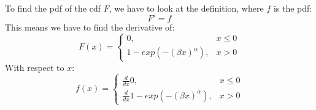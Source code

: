 To find the pdf of the cdf $F$, we have to look at the definition, where $f$ is the pdf:
$$
F' = f
$$
This means we have to find the derivative of:
$$
F(x) =
\left\{
\begin{array}{ll}
0, & x \leq 0 \\
1 - exp(- (\beta x)^\alpha), & x > 0
\end{array}
\right.
$$
With respect to $x$:
$$
f(x) =
\left\{
\begin{array}{ll}
\frac{d}{dx} 0, & x \leq 0 \\
\frac{d}{dx} 1 - exp(- (\beta x)^\alpha), & x > 0
\end{array}
\right.
$$